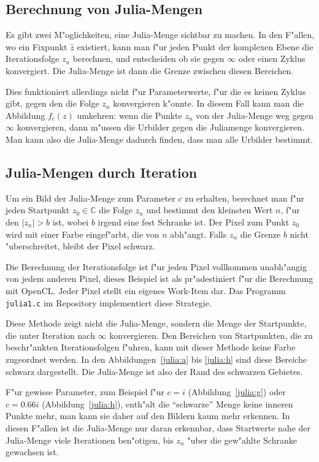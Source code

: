 \begin{refsection}
\section{Berechnung von Julia-Mengen}
Es gibt zwei M"oglichkeiten, eine Julia-Menge sichtbar zu machen.
In den F"allen, wo ein Fixpunkt $\hat z$ existiert, kann man f"ur jeden
Punkt der komplexen Ebene die Iterationsfolge $z_n$ berechnen, und
entscheiden ob sie gegen $\infty$ oder einen Zyklus konvergiert.
Die Julia-Menge ist dann die Grenze zwischen diesen Bereichen.

Dies funktioniert allerdings nicht f"ur Parameterwerte, f"ur die
es keinen Zyklus gibt, gegen den die Folge $z_n$ konvergieren k"onnte.
In diesem Fall kann man die Abbildung $f_c(z)$ umkehren: wenn die
Punkte $z_n$ von der Julia-Menge weg gegen $\infty$ konvergieren, dann 
m"ussen die Urbilder gegen die Juliamenge konvergieren.
Man kann also die Julia-Menge dadurch finden, dass man alle Urbilder
bestimmt.

\subsection{Julia-Mengen durch Iteration}
Um ein Bild der Julia-Menge zum Parameter $c$ zu erhalten, berechnet
man f"ur jeden Startpunkt $z_0\in\mathbb C$ die Folge $z_n$ und
bestimmt den kleinsten Wert $n$, f"ur den $|z_n|>b$ ist, wobei $b$
irgend eine fest Schranke ist.
Der Pixel zum Punkt $z_0$ wird mit einer Farbe eingef"arbt, die von $n$
abh"angt.
Falls $z_n$ die Grenze $b$ nicht "uberschreitet, bleibt der Pixel schwarz.

Die Berechnung der Iterationsfolge ist f"ur jeden Pixel vollkommen
unabh"angig von jedem anderen Pixel, dieses Beispiel ist als pr"adestiniert
f"ur die Berechnung mit OpenCL.
Jeder Pixel stellt ein eigenes Work-Item dar.
Das Programm {\tt julia1.c} im Repository implementiert diese Strategie.

Diese Methode zeigt nicht die Julia-Menge, sondern die Menge der Startpunkte,
die unter Iteration nach $\infty$ konvergieren. Den Bereichen von Startpunkten,
die zu beschr"ankten Iterationsfolgen f"uhren, kann mit dieser Methode
keine Farbe zugeordnet werden.
In den Abbildungen~\ref{julia:a} bis \ref{julia:h} sind diese Bereiche 
schwarz dargestellt.
Die Julia-Menge ist also der Rand des schwarzen Gebietes.

F"ur gewisse Parameter, zum Beispiel f"ur $c=i$ (Abbildung~\ref{julia:g})
oder $c=0.66i$ (Abbildung~\ref{julia:h}), enth"alt die ``schwarze'' Menge
keine inneren Punkte mehr, man kann sie daher auf den Bildern
kaum mehr erkennen.
In diesen F"allen ist die Julia-Menge nur daran erkennbar, dass Startwerte
nahe der Julia-Menge viele Iterationen ben"otigen, bis $z_n$ "uber die
gew"ahlte Schranke gewachsen ist.


\end{refsection}
